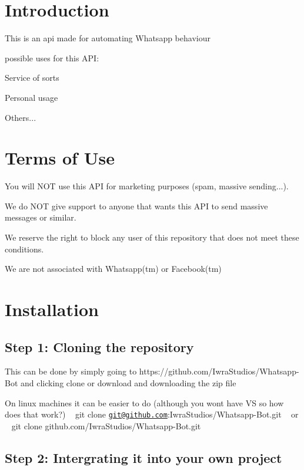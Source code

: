 \hypertarget{index_intro_sec}{}\section{Introduction}\label{index_intro_sec}
This is an api made for automating Whatsapp behaviour

possible uses for this A\+PI\+:
\begin{DoxyItemize}
\item Service of sorts
\item Personal usage
\item Others...
\end{DoxyItemize}\hypertarget{index_terms_sec}{}\section{Terms of Use}\label{index_terms_sec}

\begin{DoxyItemize}
\item You will N\+OT use this A\+PI for marketing purposes (spam, massive sending...).
\item We do N\+OT give support to anyone that wants this A\+PI to send massive messages or similar.
\item We reserve the right to block any user of this repository that does not meet these conditions.
\item We are not associated with Whatsapp(tm) or Facebook(tm)
\end{DoxyItemize}\hypertarget{index_install_sec}{}\section{Installation}\label{index_install_sec}
\hypertarget{index_step1}{}\subsection{Step 1\+: Cloning the repository}\label{index_step1}
This can be done by simply going to https\+://github.com/\+Iwra\+Studios/\+Whatsapp-\/\+Bot and clicking clone or download and downloading the zip file

On linux machines it can be easier to do (although you won\textquotesingle{}t have VS so how does that work?) ~\newline
 git clone \href{mailto:git@github.com}{\tt git@github.\+com}\+:Iwra\+Studios/\+Whatsapp-\/\+Bot.\+git ~\newline
 or ~\newline
 git clone github.\+com/\+Iwra\+Studios/\+Whatsapp-\/\+Bot.git ~\newline
 \hypertarget{index_step2}{}\subsection{Step 2\+: Intergrating it into your own project}\label{index_step2}
